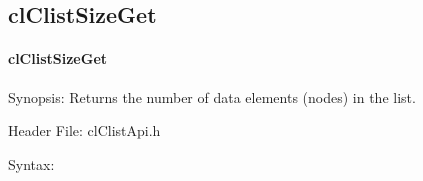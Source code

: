\begin{flushleft}
\subsection{clClistSizeGet}
\hypertarget{pagecl113}{}\paragraph{cl\-Clist\-Size\-Get}\label{pagecl113}
\begin{Desc}
\item[Synopsis:]Returns the number of data elements (nodes) in the list.\end{Desc}
\begin{Desc}
\item[Header File:]clClistApi.h\end{Desc}
\begin{Desc}
\item[Syntax:]


\end{Desc}
\end{flushleft}
